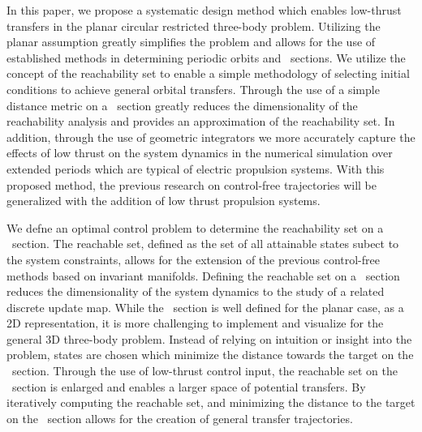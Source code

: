 \documentclass[smallcondensed]{svjour3}
\begin{document}



In this paper, we propose a systematic design method which enables low-thrust transfers in the planar circular restricted three-body problem.
Utilizing the planar assumption greatly simplifies the problem and allows for the use of established methods in determining periodic orbits and \Poincare~sections.
We utilize the concept of the reachability set to enable a simple methodology of selecting initial conditions to achieve general orbital transfers. 
Through the use of a simple distance metric on a \Poincare~section greatly reduces the dimensionality of the reachability analysis and provides an approximation of the reachability set.
In addition, through the use of geometric integrators we more accurately capture the effects of low thrust on the system dynamics in the numerical simulation over extended periods which are typical of electric propulsion systems. 
With this proposed method, the previous research on control-free trajectories will be generalized with the addition of low thrust propulsion systems.

We defne an optimal control problem to determine the reachability set on a \Poincare~section.
The reachable set, defined as the set of all attainable states subect to the system constraints, allows for the extension of the previous control-free methods based on invariant manifolds.
Defining the reachable set on a \Poincare~section reduces the dimensionality of the system dynamics to the study of a related discrete update map.
While the \Poincare~section is well defined for the planar case, as a 2D representation, it is more challenging to implement and visualize for the general 3D three-body problem.
Instead of relying on intuition or insight into the problem, states are chosen which minimize the distance towards the target on the \Poincare~section.
Through the use of low-thrust control input, the reachable set on the \Poincare~section is enlarged and enables a larger space of potential transfers.
By iteratively computing the reachable set, and minimizing the distance to the target on the \Poincare~section allows for the creation of general transfer trajectories.
\end{document}
